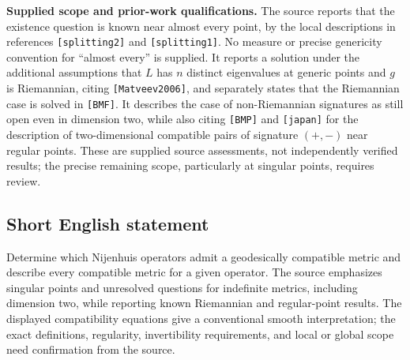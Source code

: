 \documentclass[11pt]{article}
\begin{document}
\textbf{Supplied scope and prior-work qualifications.} The source reports that the existence question is known near almost every point, by the local descriptions in references \texttt{[splitting2]} and \texttt{[splitting1]}. No measure or precise genericity convention for ``almost every'' is supplied. It reports a solution under the additional assumptions that \(L\) has \(n\) distinct eigenvalues at generic points and \(g\) is Riemannian, citing \texttt{[Matveev2006]}, and separately states that the Riemannian case is solved in \texttt{[BMF]}. It describes the case of non-Riemannian signatures as still open even in dimension two, while also citing \texttt{[BMP]} and \texttt{[japan]} for the description of two-dimensional compatible pairs of signature \((+,-)\) near regular points. These are supplied source assessments, not independently verified results; the precise remaining scope, particularly at singular points, requires review.
\subsection{Short English statement}
Determine which Nijenhuis operators admit a geodesically compatible metric and describe every compatible metric for a given operator. The source emphasizes singular points and unresolved questions for indefinite metrics, including dimension two, while reporting known Riemannian and regular-point results. The displayed compatibility equations give a conventional smooth interpretation; the exact definitions, regularity, invertibility requirements, and local or global scope need confirmation from the source.
\end{document}
